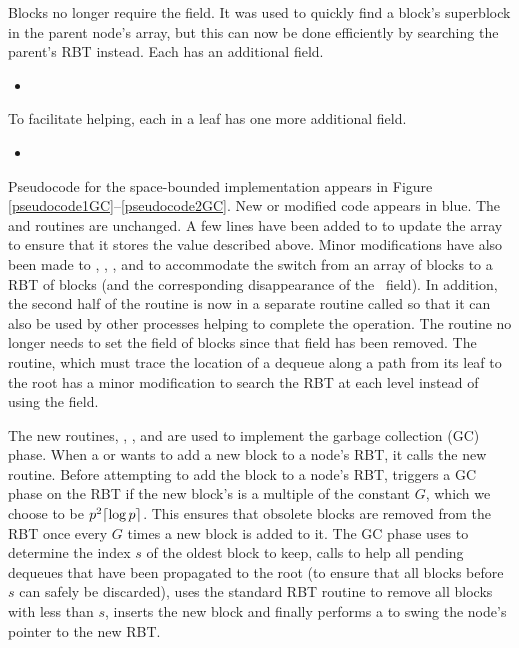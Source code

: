 Blocks no longer require the  field.  It was used to quickly find a block's 
superblock in the parent node's  array, but this can now be done efficiently 
by searching the parent's  RBT instead.
Each  has an additional field.
\begin{itemize}
\item {}  
\end{itemize}
To facilitate helping, each  in a leaf has one more additional field.
\begin{itemize}
\item {}  
\end{itemize}


Pseudocode for the space-bounded implementation appears in Figure \ref{pseudocode1GC}--\ref{pseudocode2GC}.
New or modified code appears in blue.
The  and  routines are unchanged.
A few lines have been added to  to update the  array
to ensure that it stores the value described above.
Minor modifications have also
been made to , , ,  and 
to accommodate  the switch from an array of blocks to a RBT of blocks (and the corresponding disappearance
of the \head\ field).
In addition, the second half of the  routine is now in a
separate routine called  so that it can also be used by other processes
helping to complete the operation.
The  routine no longer needs to set the  field of blocks since
that field has been removed.
The  routine, which must trace the location of a dequeue along
a path from its leaf to the root has a minor modification to search the  RBT at 
each level instead of using the  field.

The new routines, , ,  and  are
used to implement the garbage collection (GC) phase.
When a  or  wants to add a new block to a node's  RBT,
it calls the new  routine.
Before attempting to add the block to a node's RBT,  triggers a GC phase on the RBT if 
the new block's  is a multiple of the constant $G$, which we choose to be $p^2\lceil \log p \rceil$.
This ensures that obsolete blocks are removed from the RBT once every $G$ times a new block is added to it.
The GC phase uses  to determine the index $s$ of the oldest block to keep,
calls  to help all pending dequeues that have been propagated to the root
(to ensure that all blocks before $s$ can safely be discarded),
uses the standard RBT  routine \cite{Tar83}
to remove all blocks with  less than $s$,
inserts the new block
and finally performs a  to swing the node's  pointer to the new RBT.

